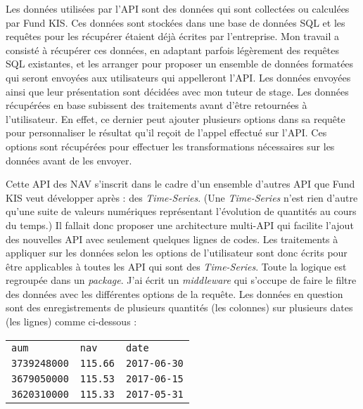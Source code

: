 \vspace{3mm}

Les données utilisées par l'API sont des données qui sont collectées ou calculées par Fund KIS. Ces données sont stockées dans une base de données SQL et les requêtes pour les récupérer étaient déjà écrites par l'entreprise. Mon travail a consisté à récupérer ces données, en adaptant parfois légèrement des requêtes SQL existantes, et les arranger pour proposer un ensemble de données formatées qui seront envoyées aux utilisateurs qui appelleront l'API. Les données envoyées ainsi que leur présentation sont décidées avec mon tuteur de stage. Les données récupérées en base subissent des traitements avant d'être retournées à l'utilisateur. En effet, ce dernier peut ajouter plusieurs options dans sa requête pour personnaliser le résultat qu'il reçoit de l'appel effectué sur l'API. Ces options sont récupérées pour effectuer les transformations nécessaires sur les données avant de les envoyer.

\vspace{3mm}

Cette API des NAV s'inscrit dans le cadre d'un ensemble d'autres API que Fund KIS veut développer après : des \textit{Time-Series}. (Une \textit{Time-Series} n'est rien d'autre qu'une suite de valeurs numériques représentant l'évolution de quantités au cours du temps.) Il fallait donc proposer une architecture multi-API qui facilite l'ajout des nouvelles API avec seulement quelques lignes de codes. Les traitements à appliquer sur les données selon les options de l'utilisateur sont donc écrits pour être applicables à toutes les API qui sont des \textit{Time-Series}. Toute la logique est regroupée dans un \textit{package}. J'ai écrit un \textit{middleware} qui s'occupe de faire le filtre des données avec les différentes options de la requête. Les données en question sont des enregistrements de plusieurs quantités (les colonnes) sur plusieurs dates (les lignes) comme ci-dessous :

\vspace{3mm}

\begin{tabular}{lll}
\centering
\texttt{aum} & \texttt{nav} & \texttt{date} \\
\texttt{3739248000} & \texttt{115.66} & \texttt{2017-06-30} \\
\texttt{3679050000} & \texttt{115.53} & \texttt{2017-06-15} \\
\texttt{3620310000} & \texttt{115.33} & \texttt{2017-05-31} \\
\end{tabular}

